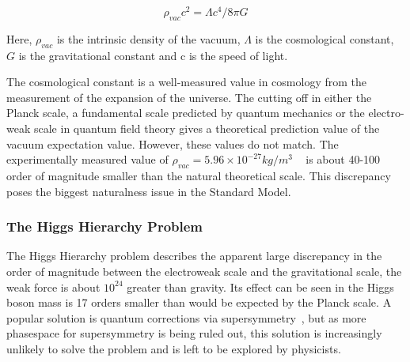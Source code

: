 \begin{equation}
    \rho_{vac}c^2=\Lambda c^4/8\pi G
\label{eq:cosmoconst}
\end{equation}

Here, $\rho_{vac}$ is the intrinsic density of the vacuum, $\Lambda$ is the cosmological constant, $G$ is the gravitational constant and c is the speed of light. 

The cosmological constant is a well-measured value in cosmology from the measurement of the expansion of the universe. The cutting off in either the Planck scale, a fundamental scale predicted by quantum mechanics or the electro-weak scale in quantum field theory gives a theoretical prediction value of the vacuum expectation value. However, these values do not match. The experimentally measured value of $\rho_{vac}= 5.96 \times 10^{-27} kg/m^{3}$ ~\cite{2016Planck} is about 40-100 order of magnitude smaller than the natural theoretical scale.
This discrepancy poses the biggest naturalness issue in the Standard Model.





\subsubsection{The Higgs Hierarchy Problem}
The Higgs Hierarchy problem describes the apparent large discrepancy in the order of magnitude between the electroweak scale and the gravitational scale, the weak force is about $10^{24}$ greater than gravity. Its effect can be seen in the Higgs boson mass is 17 orders smaller than would be expected by the Planck scale.
A popular solution is quantum corrections via supersymmetry~\cite{2018SUSY}, but as more phasespace for supersymmetry is being ruled out, this solution is increasingly unlikely to solve the problem and is left to be explored by physicists.

